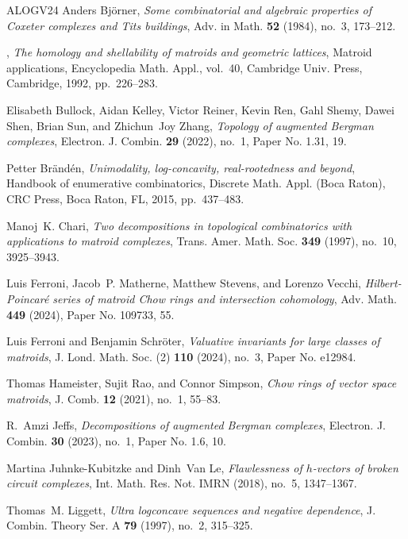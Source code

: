 \documentclass[11pt]{amsart}
\theoremstyle{theorems}
\theoremstyle{definition}
\begin{document}
\begin{thebibliography}{ALOGV24}
Anders Bj{\"o}rner, \emph{Some combinatorial and algebraic properties of {C}oxeter complexes and {T}its buildings}, Adv. in Math. \textbf{52} (1984), no.~3, 173--212. 

\bysame, \emph{The homology and shellability of matroids and geometric lattices}, Matroid applications, Encyclopedia Math. Appl., vol.~40, Cambridge Univ. Press, Cambridge, 1992, pp.~226--283. 

Elisabeth Bullock, Aidan Kelley, Victor Reiner, Kevin Ren, Gahl Shemy, Dawei Shen, Brian Sun, and Zhichun~Joy Zhang, \emph{Topology of augmented {B}ergman complexes}, Electron. J. Combin. \textbf{29} (2022), no.~1, Paper No. 1.31, 19. 

Petter Br{\"a}nd{\'e}n, \emph{Unimodality, log-concavity, real-rootedness and beyond}, Handbook of enumerative combinatorics, Discrete Math. Appl. (Boca Raton), CRC Press, Boca Raton, FL, 2015, pp.~437--483. 

Manoj~K. Chari, \emph{Two decompositions in topological combinatorics with applications to matroid complexes}, Trans. Amer. Math. Soc. \textbf{349} (1997), no.~10, 3925--3943. 

Luis Ferroni, Jacob~P. Matherne, Matthew Stevens, and Lorenzo Vecchi, \emph{Hilbert-{P}oincar\'e{} series of matroid {C}how rings and intersection cohomology}, Adv. Math. \textbf{449} (2024), Paper No. 109733, 55. 

Luis Ferroni and Benjamin Schr\"oter, \emph{Valuative invariants for large classes of matroids}, J. Lond. Math. Soc. (2) \textbf{110} (2024), no.~3, Paper No. e12984. 

Thomas Hameister, Sujit Rao, and Connor Simpson, \emph{Chow rings of vector space matroids}, J. Comb. \textbf{12} (2021), no.~1, 55--83. 

R.~Amzi Jeffs, \emph{Decompositions of augmented {B}ergman complexes}, Electron. J. Combin. \textbf{30} (2023), no.~1, Paper No. 1.6, 10. 

Martina Juhnke-Kubitzke and Dinh~Van Le, \emph{Flawlessness of {$h$}-vectors of broken circuit complexes}, Int. Math. Res. Not. IMRN (2018), no.~5, 1347--1367. 

Thomas~M. Liggett, \emph{Ultra logconcave sequences and negative dependence}, J. Combin. Theory Ser. A \textbf{79} (1997), no.~2, 315--325. 


\end{thebibliography}
\end{document}

